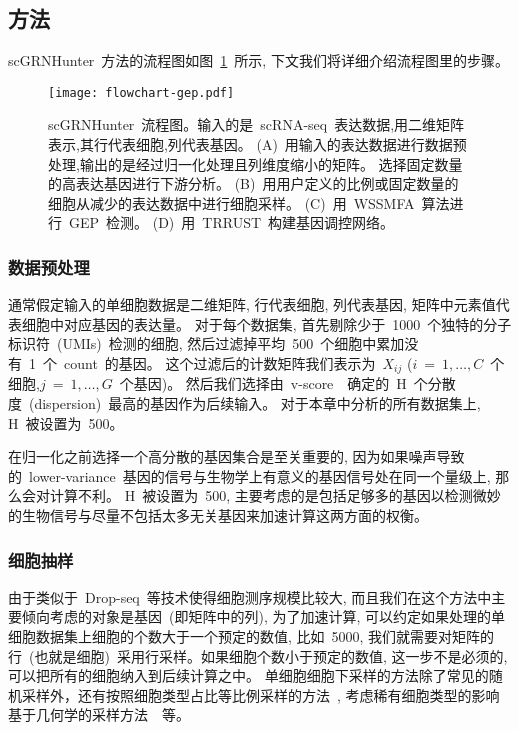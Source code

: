 \subsection{方法}
scGRNHunter~方法的流程图如图~\ref{fig:gep-flowchart}~所示, 下文我们将详细介绍流程图里的步骤。
\begin{figure}[!htbp]
    \centering
    \texttt{[image: flowchart-gep.pdf]}
    \caption{
        scGRNHunter~流程图。输入的是~scRNA-seq~表达数据,用二维矩阵表示,其行代表细胞,列代表基因。
        (A)~用输入的表达数据进行数据预处理,输出的是经过归一化处理且列维度缩小的矩阵。
        选择固定数量的高表达基因进行下游分析。
        (B)~用用户定义的比例或固定数量的细胞从减少的表达数据中进行细胞采样。
        (C)~用~WSSMFA~算法进行~GEP~检测。
        (D)~用~TRRUST~构建基因调控网络。
    }
    \label{fig:gep-flowchart}
\end{figure}


\subsubsection{数据预处理}
通常假定输入的单细胞数据是二维矩阵, 行代表细胞, 列代表基因, 矩阵中元素值代表细胞中对应基因的表达量。
对于每个数据集, 首先剔除少于~1000~个独特的分子标识符~(UMIs)~检测的细胞,
然后过滤掉平均~500~个细胞中累加没有~1~个~count~的基因。
这个过滤后的计数矩阵我们表示为~$X_{ij}$ ($i~=~1,\ldots, C$~个细胞,$j~=~1,\ldots, G$~个基因)。
然后我们选择由~v-score~\cite{klein2015droplet}~确定的~H~个分散度~(dispersion)~最高的基因作为后续输入。
对于本章中分析的所有数据集上, H~被设置为~500。

在归一化之前选择一个高分散的基因集合是至关重要的, 
因为如果噪声导致的~lower-variance~基因的信号与生物学上有意义的基因信号处在同一个量级上, 那么会对计算不利。 
H~被设置为~500, 主要考虑的是包括足够多的基因以检测微妙的生物信号与尽量不包括太多无关基因来加速计算这两方面的权衡。

\subsubsection{细胞抽样}
由于类似于~Drop-seq~等技术使得细胞测序规模比较大, 而且我们在这个方法中主要倾向考虑的对象是基因~(即矩阵中的列), 
为了加速计算, 可以约定如果处理的单细胞数据集上细胞的个数大于一个预定的数值, 比如~5000,
我们就需要对矩阵的行~(也就是细胞)~采用行采样。如果细胞个数小于预定的数值, 这一步不是必须的, 可以把所有的细胞纳入到后续计算之中。
单细胞细胞下采样的方法除了常见的随机采样外，还有按照细胞类型占比等比例采样的方法~\cite{sinha2018dropclust},
考虑稀有细胞类型的影响基于几何学的采样方法~\cite{hie2019geometric}~等。

